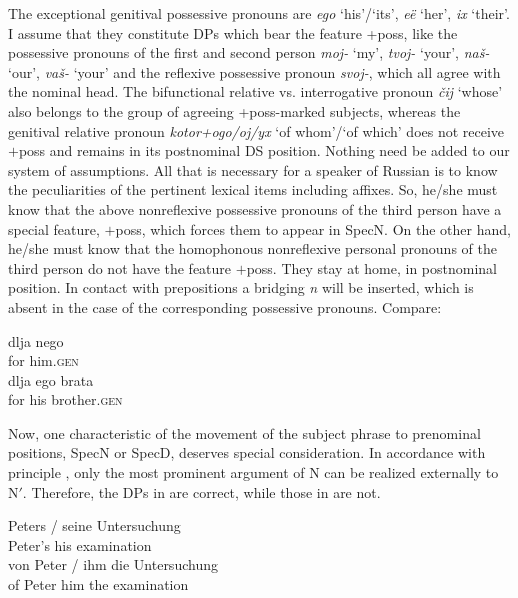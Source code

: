 \documentclass[output=paper,colorlinks,citecolor=brown]{langscibook}
\begin{document}
\noindent The exceptional genitival possessive pronouns are \textit{ego} `his'/`its', \textit{eë} `her', \textit{ix} `their'. I assume that they constitute DPs which bear the feature +poss, like the possessive pronouns of the first and second person \textit{moj-} `my', \textit{tvoj-} `your', \textit{naš-} `our', \textit{vaš-} `your' and the reflexive possessive pronoun \textit{svoj-}, which all agree with the nominal head. The bifunctional relative vs. interrogative pronoun \textit{čij} `whose' also belongs to the group of agreeing +poss-marked subjects, whereas the genitival relative pronoun \textit{kotor+ogo/oj/yx} `of whom'/`of which' does not receive $+$poss and remains in its postnominal DS position. Nothing need be added to our system of assumptions. All that is necessary for a speaker of Russian is to know the peculiarities of the pertinent lexical items including affixes. So, he/she must know that the above nonreflexive possessive pronouns of the third person have a special feature, $+$poss, which forces them to appear in SpecN. On the other hand, he/she must know that the homophonous nonreflexive personal pronouns of the third person do not have the feature $+$poss. They stay at home, in postnominal position. In contact with prepositions a bridging \textit{n} will be inserted, which is absent in the case of the corresponding possessive pronouns. Compare:

\ea \label{ex:zi91:63}
    \ea \label{ex:zi91:63a} 
        \gll dlja nego \\
        for him.\textsc{gen} \\
        \glt
    \ex \label{ex:zi91:63b}
        \gll dlja ego brata \\ 
        for his brother.\textsc{gen} \\
        \glt
    \z
\z

\noindent Now, one characteristic of the movement of the subject phrase to prenominal positions, SpecN or SpecD, deserves special consideration. In accordance with principle , only the most prominent argument of N can be realized externally to N$'$. Therefore, the DPs in  are correct, while those in  are not.

\ea \label{ex:zi91:64}
    \ea \label{ex:zi91:64a} 
    \gll Peters / seine Untersuchung\\
    Peter's {} his examination\\
    
    \ex \label{ex:zi91:64b} 
    \gll von Peter / ihm die Untersuchung\\
    of Peter {} him the examination\\
    
\end{document}
